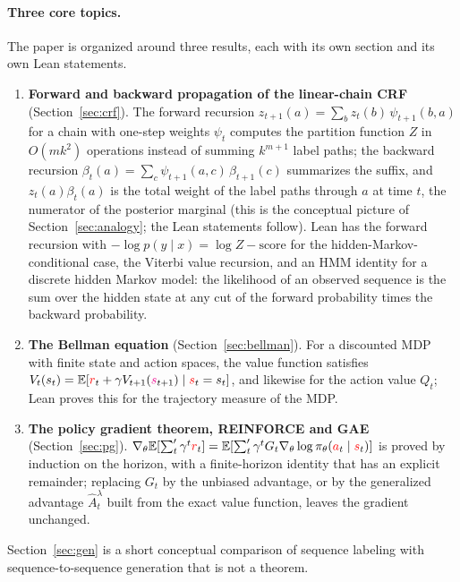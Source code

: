 \documentclass[11pt,a4paper]{article}
\newcommand{\E}{\mathbb{E}}
\newcommand{\rv}[1]{{\color{red}#1}}       %
\newcommand{\ra}[1]{{\color{magenta}#1}}   %
\newcommand{\sv}{\rv{s}}
\newcommand{\av}{\rv{a}}
\newcommand{\rw}{\rv{r}}
\newcommand{\grad}{\nabla_{\theta}}
\newcommand{\tsum}{\textstyle\sum'}
\begin{document}
\paragraph{Three core topics.}
The paper is organized around three results, each with its own section and its own Lean statements.
\begin{enumerate}[leftmargin=1.6em,itemsep=0.25em]
  \item \textbf{Forward and backward propagation of the linear-chain CRF} (Section~\ref{sec:crf}).
  The forward recursion $z_{t+1}(a)=\sum_bz_t(b)\,\psi_{t+1}(b,a)$ for a chain with one-step weights $\psi_t$ computes the partition function $Z$ in $O(mk^2)$ operations instead of summing $k^{m+1}$ label paths; the backward recursion $\beta_t(a)=\sum_c\psi_{t+1}(a,c)\,\beta_{t+1}(c)$ summarizes the suffix, and $z_t(a)\beta_t(a)$ is the total weight of the label paths through $a$ at time $t$, the numerator of the posterior marginal (this is the conceptual picture of Section~\ref{sec:analogy}; the Lean statements follow).
  Lean has the forward recursion with $-\log p(y\mid x)=\log Z-\text{score}$ for the hidden-Markov-conditional case, the Viterbi value recursion, and an HMM identity for a discrete hidden Markov model: the likelihood of an observed sequence is the sum over the hidden state at any cut of the forward probability times the backward probability.
  \item \textbf{The Bellman equation} (Section~\ref{sec:bellman}).
  For a discounted MDP with finite state and action spaces, the value function satisfies $V_t(s_t)=\E[\rw_t+\gamma V_{t+1}(\ra{s}_{t+1})\mid\sv_t=s_t]$, and likewise for the action value $Q_t$; Lean proves this for the trajectory measure of the MDP.
  \item \textbf{The policy gradient theorem, REINFORCE and GAE} (Section~\ref{sec:pg}).
  $\grad\E[\tsum_t\gamma^t\rw_t]=\E[\tsum_t\gamma^tG_t\grad\log\pi_\theta(\av_t\mid\sv_t)]$ is proved by induction on the horizon, with a finite-horizon identity that has an explicit remainder; replacing $G_t$ by the unbiased advantage, or by the generalized advantage $\hat A^\lambda_t$ built from the exact value function, leaves the gradient unchanged.
\end{enumerate}
Section~\ref{sec:gen} is a short conceptual comparison of sequence labeling with sequence-to-sequence generation that is not a theorem.
\end{document}
